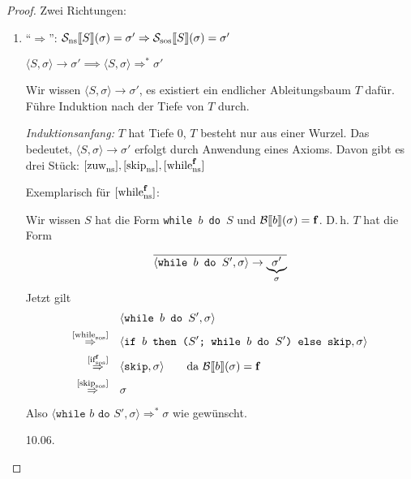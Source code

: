 \begin{proof}
    Zwei Richtungen:
    \begin{enumerate}
        \item ``$\Rightarrow$'': $\mathcal{S_{\text{ns}}}\lsem S \rsem(\sigma) = \sigma' \Rightarrow \mathcal{S_{\text{sos}}}\lsem S \rsem(\sigma) = \sigma'$

            \dh{} $\langle S, \sigma \rangle \to \sigma' \implies \langle S, \sigma \rangle \Rightarrow^* \sigma'$

            Wir wissen $\langle S, \sigma \rangle \to \sigma'$, \dh{} es existiert ein endlicher Ableitungsbaum $T$ dafür. Führe Induktion nach der Tiefe von $T$ durch.

            \par\medskip
            \emph{Induktionsanfang:} $T$ hat Tiefe 0, \dh{} $T$ besteht nur aus einer Wurzel. Das bedeutet, $\langle S, \sigma \rangle \to \sigma'$ erfolgt durch Anwendung eines Axioms. Davon gibt es drei Stück: $\infruleNs{zuw}, \infruleNs{skip}, \infruleNs[\false]{while}$

            Exemplarisch für $\infruleNs[\false]{while}$:

            Wir wissen $S$ hat die Form \texttt{while $b$ do $S$} und $\Bsem{b}(\sigma) = \false$. D.\,h. $T$ hat die Form
            \[
                \frac{}{
                    \strans{\texttt{while $b$ do $S'$}}{\sigma}{\underbrace{\sigma'}_{\sigma}}
                }
            \]
            Jetzt gilt
            \begin{align*}
                & \langle \texttt{while $b$ do $S'$}, \sigma \rangle \\
                \overset{\infruleSos{while}}{\Rightarrow} \quad & \langle \texttt{if $b$ then ($S'$; while $b$ do $S'$) else skip} , \sigma \rangle \\
                \overset{\infruleSos[\false]{if}}{\Rightarrow} \quad & \langle \texttt{skip}, \sigma \rangle \quad\quad \text{da } \Bsem{b}(\sigma) = \false \\
                \overset{\infruleSos{skip}}{\Rightarrow} \quad & \sigma \\
            \end{align*}
            Also $\langle \texttt{while $b$ do $S'$}, \sigma \rangle \Rightarrow^* \sigma$ wie gewünscht.

\newpage
\hfill 10.06.


\end{enumerate}
\end{proof}
